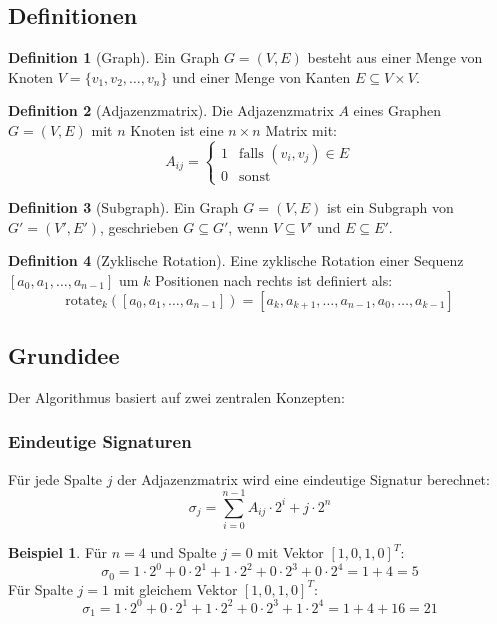\documentclass[a4paper,12pt]{article}
\theoremstyle{definition}
\newtheorem{definition}{Definition}
\newtheorem{beispiel}{Beispiel}
\begin{document}
\subsection{Definitionen}

\begin{definition}[Graph]
	Ein Graph $G = (V, E)$ besteht aus einer Menge von Knoten $V = \{v_1, v_2, \ldots, v_n\}$ und einer Menge von Kanten $E \subseteq V \times V$.
\end{definition}

\begin{definition}[Adjazenzmatrix]
	Die Adjazenzmatrix $A$ eines Graphen $G = (V, E)$ mit $n$ Knoten ist eine $n \times n$ Matrix mit:
	\[
	A_{ij} = \begin{cases}
		1 & \text{falls } (v_i, v_j) \in E \\
		0 & \text{sonst}
	\end{cases}
	\]
\end{definition}

\begin{definition}[Subgraph]
	Ein Graph $G = (V, E)$ ist ein Subgraph von $G' = (V', E')$, geschrieben $G \subseteq G'$, wenn $V \subseteq V'$ und $E \subseteq E'$.
\end{definition}

\begin{definition}[Zyklische Rotation]
	Eine zyklische Rotation einer Sequenz $[a_0, a_1, \ldots, a_{n-1}]$ um $k$ Positionen nach rechts ist definiert als:
	\[
	\text{rotate}_k([a_0, a_1, \ldots, a_{n-1}]) = [a_k, a_{k+1}, \ldots, a_{n-1}, a_0, \ldots, a_{k-1}]
	\]
\end{definition}

\subsection{Grundidee}

Der Algorithmus basiert auf zwei zentralen Konzepten:

\subsubsection{Eindeutige Signaturen}

Für jede Spalte $j$ der Adjazenzmatrix wird eine eindeutige Signatur berechnet:
\[
\sigma_j = \sum_{i=0}^{n-1} A_{ij} \cdot 2^i + j \cdot 2^n
\]

\begin{beispiel}
	Für $n=4$ und Spalte $j=0$ mit Vektor $[1, 0, 1, 0]^T$:
	\[
	\sigma_0 = 1 \cdot 2^0 + 0 \cdot 2^1 + 1 \cdot 2^2 + 0 \cdot 2^3 + 0 \cdot 2^4 = 1 + 4 = 5
	\]
	Für Spalte $j=1$ mit gleichem Vektor $[1, 0, 1, 0]^T$:
	\[
	\sigma_1 = 1 \cdot 2^0 + 0 \cdot 2^1 + 1 \cdot 2^2 + 0 \cdot 2^3 + 1 \cdot 2^4 = 1 + 4 + 16 = 21
	\]
\end{beispiel}
\end{document}
